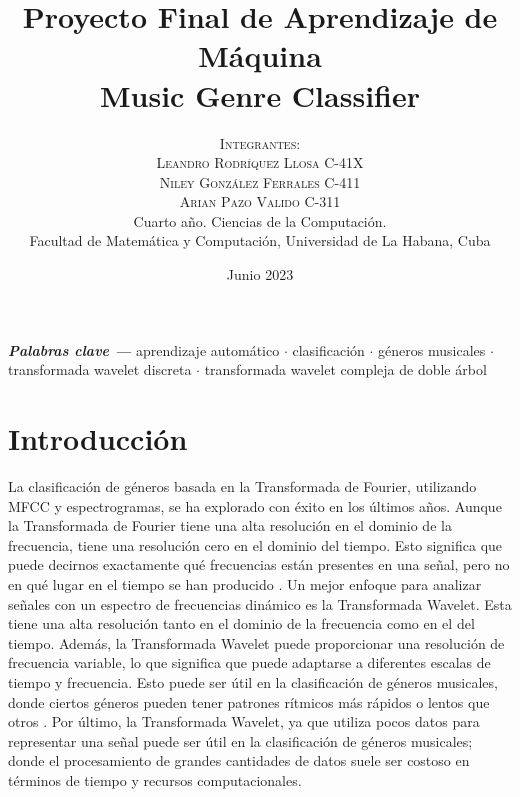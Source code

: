 \documentclass[colorinlistoftodos,twoside,twocolumn,10pt]{article} %
\title{\normalsize{Proyecto Final de Aprendizaje de Máquina}\\
	\Huge\bfseries Music Genre Classifier\\
} %
\author{%
	\normalsize\textsc{Integrantes:}\\
	\normalsize\textsc{Leandro Rodr\'iquez Llosa  C-41X}\\
	\normalsize\textsc{Niley Gonz\'alez Ferrales  C-411}\\
	\normalsize\textsc{Arian Pazo Valido  C-311} \\[2ex]
	\small Cuarto a\~no. Ciencias de la Computaci\'on. \\ %
	\small Facultad de Matem\'atica y Computaci\'on, Universidad de La Habana, Cuba \\ %
}
\date{\footnotesize Junio 2023 } %
\providecommand{\keywords}[1]
{
	\small	
	\vspace{0.5em}
	\noindent \textbf{\textit{Palabras clave --- }} #1
}
\renewenvironment{abstract}
{\small
	\begin{center}
		\bfseries \abstractname\vspace{-.5em}\vspace{0pt}
	\end{center}
	\list{}{
		\setlength{\leftmargin}{0.9cm}%
		\setlength{\rightmargin}{\leftmargin}%
	}%
	\item\relax}
{\endlist}
\begin{document}
	\maketitle

	\begin{abstract}

		\vspace{1em}
		\keywords{ 
			aprendizaje automático \textbf{$\cdot$} clasificación \textbf{$\cdot$}  géneros musicales \textbf{$\cdot$} transformada wavelet discreta \textbf{$\cdot$} transformada wavelet compleja de doble árbol
		}

	\end{abstract}
	
	
	\section{Introducción}
	
	 La clasificación de géneros basada en la Transformada de Fourier, utilizando MFCC y espectrogramas, se ha explorado con éxito en los últimos años. Aunque la Transformada de Fourier tiene una alta resolución en el dominio de la frecuencia, tiene una resolución cero en el dominio del tiempo. Esto significa que puede decirnos exactamente qué frecuencias están presentes en una señal, pero no en qué lugar en el tiempo se han producido \cite{wavelet transform in machine learning}. Un mejor enfoque para analizar señales con un espectro de frecuencias dinámico es la Transformada Wavelet. Esta tiene una alta resolución tanto en el dominio de la frecuencia como en el del tiempo. Además, la Transformada Wavelet puede proporcionar una resolución de frecuencia variable, lo que significa que puede adaptarse a diferentes escalas de tiempo y frecuencia. Esto puede ser útil en la clasificación de géneros musicales, donde ciertos géneros pueden tener patrones rítmicos más rápidos o lentos que otros \cite{Musical Genre Classification Of Audio Signals}. Por último, la Transformada Wavelet, ya que utiliza pocos datos para representar una señal puede ser útil en la clasificación de géneros musicales; donde el procesamiento de grandes cantidades de datos suele ser costoso en términos de tiempo y recursos computacionales.   
\end{document}

